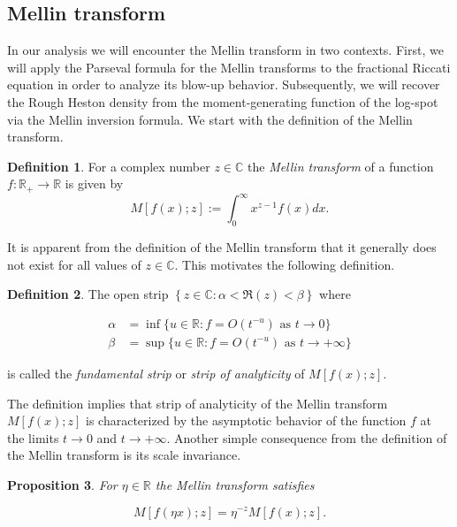 \documentclass[12pt,twoside]{article}
\theoremstyle{plain}
\theoremstyle{plain}
\newtheorem{proposition}{Proposition}[section]
\theoremstyle{definition}
\newtheorem{definition}[proposition]{Definition}
\theoremstyle{remark}
\numberwithin{equation}{section}
\begin{document}
\subsection{Mellin transform}
\label{sec: mellin transform}

In our analysis we will encounter the Mellin transform in two contexts.
First, we will apply the Parseval formula for the Mellin transforms to the fractional Riccati equation in order to analyze its blow-up behavior. Subsequently, we will recover the Rough Heston density from the moment-generating function of the log-spot via the Mellin inversion formula. We start with the definition of the Mellin transform.

\begin{definition}
For a complex number $z \in \mathbb C$ the \emph{Mellin transform} of a function $f: \mathbb{R}_{+} \rightarrow \mathbb{R}$ is given by
\begin{equation}
\label{eq: mellin transform}
M[f(x); z] := \int_{0}^{\infty} x^{z-1} f(x) d x.
\end{equation}

\end{definition}

It is apparent from the definition of the Mellin transform that it generally does not exist for all values of $z\in \mathbb C$. This motivates the following definition.

\begin{definition}
The open strip $\left\{z \in \mathbb C: \alpha < \Re (z) < \beta\right\}$ where

$$
\begin{aligned}
\alpha &= \inf\{u \in \mathbb R : f = O(t^{-u}) \text{ as } t \rightarrow 0\} \\[5pt]
\beta &= \sup\{u \in \mathbb R : f = O(t^{-u}) \text{ as } t \rightarrow +\infty\}
\end{aligned}
$$

is called the \emph{fundamental strip} or \emph{strip of analyticity} of $M[f(x); z]$.
\end{definition}

The definition implies that strip of analyticity of the Mellin transform $M[f(x);z]$ is characterized by the asymptotic behavior of the function $f$ at the limits $t\rightarrow 0$ and $t\rightarrow +\infty$. Another simple consequence from the definition of the Mellin transform is its scale invariance.

\begin{proposition}

For $\eta \in \mathbb R$ the Mellin transform satisfies

\begin{equation}
\label{eq: mellin scale invariance}
M[f(\eta x); z] = \eta^{-z} M[f(x); z].
\end{equation}

\end{proposition}
\end{document}
